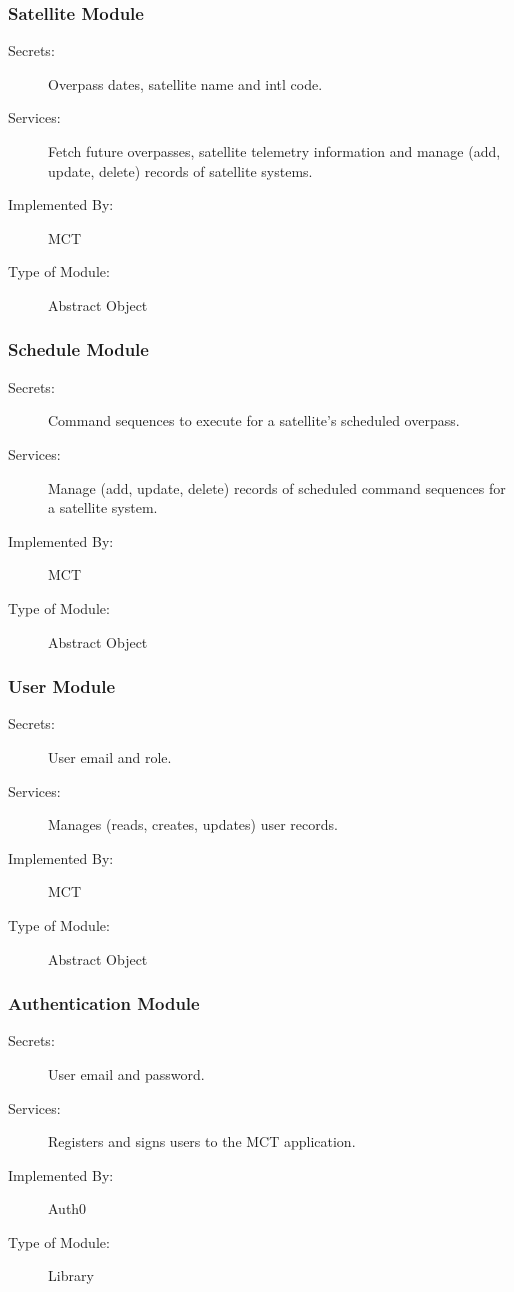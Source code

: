 \documentclass[12pt, titlepage]{article}
\begin{document}
\subsubsection{Satellite Module}

\begin{description}
\item[Secrets:]Overpass dates, satellite name and intl code.
\item[Services:]Fetch future overpasses, satellite telemetry information and manage (add, update, delete) records of satellite systems.
\item[Implemented By:] MCT
\item[Type of Module:] Abstract Object
\end{description}

\subsubsection{Schedule Module }

\begin{description}
\item[Secrets:] Command sequences to execute for a satellite's scheduled overpass.
\item[Services:]Manage (add, update, delete) records of scheduled command sequences for a satellite system.
\item[Implemented By:] MCT
\item[Type of Module:] Abstract Object
\end{description}

\subsubsection{User Module }

\begin{description}
\item[Secrets:] User email and role.
\item[Services:] Manages (reads, creates, updates) user records.
\item[Implemented By:] MCT
\item[Type of Module:] Abstract Object
\end{description}

\subsubsection{Authentication Module }

\begin{description}
\item[Secrets:] User email and password.
\item[Services:] Registers and signs users to the MCT application.
\item[Implemented By:] Auth0
\item[Type of Module:] Library
\end{description}
\end{document}
